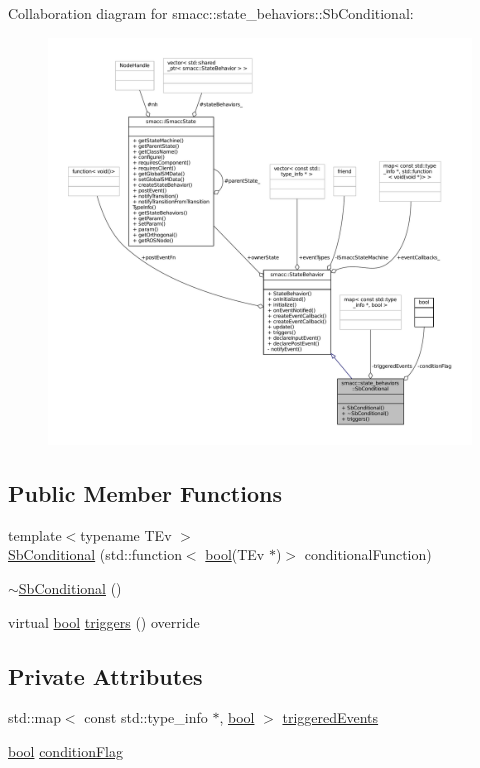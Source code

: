Collaboration diagram for smacc\+:\+:state\+\_\+behaviors\+:\+:Sb\+Conditional\+:
\nopagebreak
\begin{figure}[H]
\begin{center}
\leavevmode
\includegraphics[width=350pt]{classsmacc_1_1state__behaviors_1_1SbConditional__coll__graph}
\end{center}
\end{figure}
\subsection*{Public Member Functions}
\begin{DoxyCompactItemize}
\item 
{\footnotesize template$<$typename T\+Ev $>$ }\\\hyperlink{classsmacc_1_1state__behaviors_1_1SbConditional_a6543569873a5226d7ef82ec4630bd0d3}{Sb\+Conditional} (std\+::function$<$ \hyperlink{classbool}{bool}(T\+Ev $\ast$)$>$ conditional\+Function)
\item 
\hyperlink{classsmacc_1_1state__behaviors_1_1SbConditional_a49f13f5cce42ab5c51675129f0e93a6b}{$\sim$\+Sb\+Conditional} ()
\item 
virtual \hyperlink{classbool}{bool} \hyperlink{classsmacc_1_1state__behaviors_1_1SbConditional_aa5462a0614b00c34fb1346ea6d5ee0d5}{triggers} () override
\end{DoxyCompactItemize}
\subsection*{Private Attributes}
\begin{DoxyCompactItemize}
\item 
std\+::map$<$ const std\+::type\+\_\+info $\ast$, \hyperlink{classbool}{bool} $>$ \hyperlink{classsmacc_1_1state__behaviors_1_1SbConditional_ae05538e05b1308e90913fbc358b92e68}{triggered\+Events}
\item 
\hyperlink{classbool}{bool} \hyperlink{classsmacc_1_1state__behaviors_1_1SbConditional_aa998f63dc35b51916a896c62d9e03df1}{condition\+Flag}
\end{DoxyCompactItemize}

